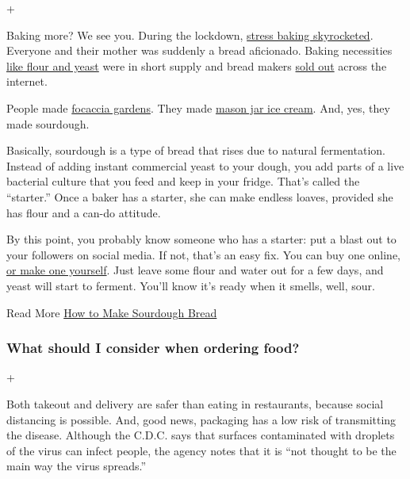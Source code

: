 +

Baking more? We see you. During the lockdown,
\href{https://www.nytimes3xbfgragh.onion/2020/03/30/style/bread-baking-coronavirus.html}{stress
baking skyrocketed}. Everyone and their mother was suddenly a bread
aficionado. Baking necessities
\href{https://www.washingtonpost.com/news/voraciously/wp/2020/03/24/people-are-baking-bread-like-crazy-and-now-were-running-out-of-flour-and-yeast/}{like
flour and yeast} were in short supply and bread makers
\href{https://people.com/food/bread-makers-viral-amazon/}{sold out}
across the internet.

People made
\href{https://www.nytimes3xbfgragh.onion/2020/04/24/dining/focaccia-bread.html}{focaccia
gardens}. They made
\href{https://www.nytimes3xbfgragh.onion/2020/05/09/at-home/virus-make-ice-cream-in-a-mason-jar.html}{mason
jar ice cream}. And, yes, they made sourdough.

Basically, sourdough is a type of bread that rises due to natural
fermentation. Instead of adding instant commercial yeast to your dough,
you add parts of a live bacterial culture that you feed and keep in your
fridge. That's called the ``starter.'' Once a baker has a starter, she
can make endless loaves, provided she has flour and a can-do attitude.

By this point, you probably know someone who has a starter: put a blast
out to your followers on social media. If not, that's an easy fix. You
can buy one online,
\href{https://www.kingarthurflour.com/recipes/sourdough-starter-recipe}{or
make one yourself}. Just leave some flour and water out for a few days,
and yeast will start to ferment. You'll know it's ready when it smells,
well, sour.

Read More
\href{https://cooking.nytimes3xbfgragh.onion/guides/59-how-to-make-sourdough-bread}{How
to Make Sourdough Bread}

\hypertarget{what-should-i-consider-when-ordering-food}{%
\subsubsection{What should I consider when ordering
food?}\label{what-should-i-consider-when-ordering-food}}

+

Both takeout and delivery are safer than eating in restaurants, because
social distancing is possible. And, good news, packaging has a low risk
of transmitting the disease. Although the C.D.C. says that surfaces
contaminated with droplets of the virus can infect people, the agency
notes that it is ``not thought to be the main way the virus spreads.''

